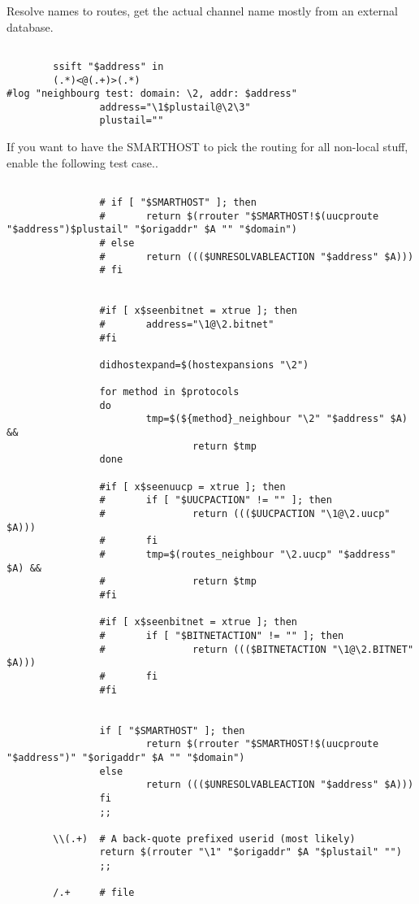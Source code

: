 Resolve names to routes, get the actual channel name mostly from an external database.

\begin{tscreen}
\begin{verbatim}

        ssift "$address" in
        (.*)<@(.+)>(.*) 
#log "neighbourg test: domain: \2, addr: $address"
                address="\1$plustail@\2\3"
                plustail=""
\end{verbatim}
\end{tscreen}


If you want to have the SMARTHOST to pick the routing
for all non-local stuff, enable the following test case..

\begin{tscreen}
\begin{verbatim}

                # if [ "$SMARTHOST" ]; then
                #       return $(rrouter "$SMARTHOST!$(uucproute "$address")$plustail" "$origaddr" $A "" "$domain")
                # else
                #       return ((($UNRESOLVABLEACTION "$address" $A)))
                # fi


                #if [ x$seenbitnet = xtrue ]; then
                #       address="\1@\2.bitnet"
                #fi

                didhostexpand=$(hostexpansions "\2")

                for method in $protocols
                do
                        tmp=$(${method}_neighbour "\2" "$address" $A) &&
                                return $tmp
                done

                #if [ x$seenuucp = xtrue ]; then
                #       if [ "$UUCPACTION" != "" ]; then
                #               return ((($UUCPACTION "\1@\2.uucp" $A)))
                #       fi
                #       tmp=$(routes_neighbour "\2.uucp" "$address" $A) &&
                #               return $tmp
                #fi

                #if [ x$seenbitnet = xtrue ]; then
                #       if [ "$BITNETACTION" != "" ]; then
                #               return ((($BITNETACTION "\1@\2.BITNET" $A)))
                #       fi
                #fi


                if [ "$SMARTHOST" ]; then
                        return $(rrouter "$SMARTHOST!$(uucproute "$address")" "$origaddr" $A "" "$domain")
                else
                        return ((($UNRESOLVABLEACTION "$address" $A)))
                fi
                ;;

        \\(.+)  # A back-quote prefixed userid (most likely)
                return $(rrouter "\1" "$origaddr" $A "$plustail" "")
                ;;

        /.+     # file
\end{verbatim}
\end{tscreen}


